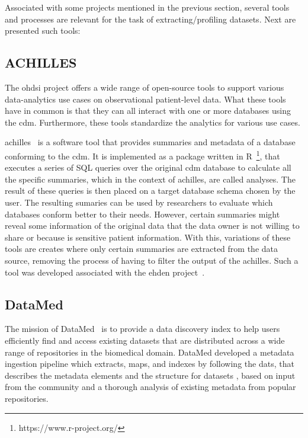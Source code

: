 Associated with some projects mentioned in the previous section, several tools and
processes are relevant for the task of extracting/profiling datasets.
Next are presented such tools:

\subsection*{ACHILLES}
The \gls{ohdsi} project offers a wide range of open-source tools\cite{ohdsi-tools} to support various data-analytics use cases on observational patient-level data.
What these tools have in common is that they can all interact with one or more databases using the \gls{cdm}.
Furthermore, these tools standardize the analytics for various use cases.

\gls{achilles}~\cite{achilles-github} is a software tool that provides summaries and metadata of a database conforming to the \gls{cdm}.
It is implemented as a package written in R~\footnote{https://www.r-project.org/}, that executes a series of SQL queries over the original \gls{cdm} database to calculate all the specific summaries, which in the context of \gls{achilles}, are called analyses.
The result of these queries is then placed on a target database schema chosen by the user.
The resulting sumaries can be used by researchers to evaluate which databases conform better to their needs.
However, certain summaries might reveal some information of the original data that the data owner is not willing to share or because is sensitive patient information.
With this, variations of these tools are creates where only certain summaries are extracted from the data source, removing the process of having to filter the output of the \gls{achilles}.
Such a tool was developed associated with the \gls{ehden} project~\cite{peters-tool}.

\subsection*{DataMed}
The mission of DataMed~\cite{datamed} is to provide a data discovery index to help users efficiently find and access existing datasets that are distributed across a wide range of repositories in the biomedical domain.
DataMed developed a metadata ingestion pipeline which extracts, maps, and indexes by following the \gls{dats}, that describes the metadata elements and the structure for datasets \cite{dats}, based on input from the community and a thorough analysis of existing metadata from popular repositories.

